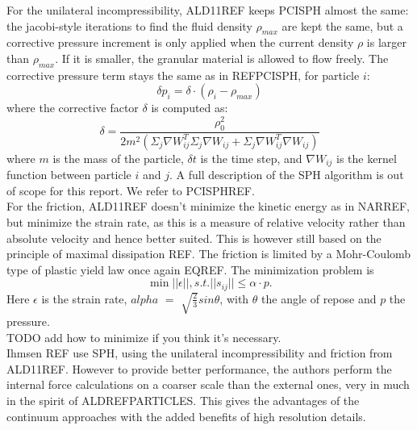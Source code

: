 For the unilateral incompressibility, ALD11REF keeps PCISPH almost the same: the jacobi-style iterations to find the fluid density $\rho_{max}$ are kept the same, but a corrective pressure increment is only applied when the current density $\rho$ is larger than $\rho_{max}$. If it is smaller, the granular material is allowed to flow freely. The corrective pressure term stays the same as in REFPCISPH, for particle $i$:
\begin{equation}
\delta p_i = \delta \cdot (\rho_i - \rho_{max})
\end{equation}
where the corrective factor $\delta$ is computed as:
\begin{equation}
\delta = \frac{\rho_0^2}{2m^2 (\Sigma_j \nabla W_{ij}^T \Sigma_j \nabla W_{ij} + \Sigma_j \nabla W_{ij}^T\nabla W_{ij})}
\end{equation}
where $m$ is the mass of the particle, $\delta t$ is the time step, and $\nabla W_{ij}$ is the kernel function between particle $i$ and $j$. A full description of the SPH algorithm is out of scope for this report. We refer to PCISPHREF.\\

For the friction, ALD11REF doesn't minimize the kinetic energy as in NARREF, but minimize the strain rate, as this is a measure of relative velocity rather than absolute velocity and hence better suited. This is however still based on the principle of maximal dissipation REF. The friction is limited by a Mohr-Coulomb type of plastic yield law once again EQREF. The minimization problem is\\
\begin{equation}
\min ||\epsilon||, s.t. ||s_{ij}|| \leq \alpha \cdot p.
\end{equation}
Here $\epsilon$ is the strain rate, $alpha$ $=$ $\sqrt{\frac{2}{3}} sin \theta$, with $\theta$ the angle of repose and $p$ the pressure.\\

TODO add how to minimize if you think it's necessary.\\


Ihmsen REF use SPH, using the unilateral incompressibility and friction from ALD11REF. However to provide better performance, the authors perform the internal force calculations on a coarser scale than the external ones, very in much in the spirit of ALDREFPARTICLES. This gives the advantages of the continuum approaches with the added benefits of high resolution details.\\




\ifx\isEmbedded\undefined


\pagebreak

\fi